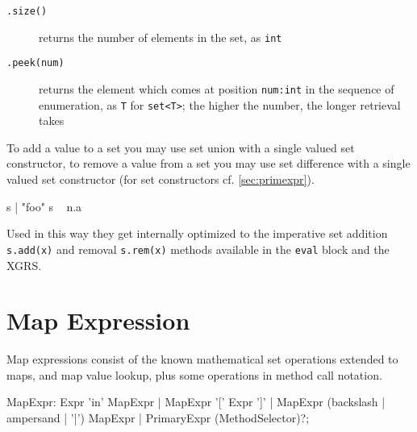 \begin{description}
\item[\texttt{.size()}] returns the number of elements in the set, as \texttt{int}
\item[\texttt{.peek(num)}] returns the element which comes at position \texttt{num:int} in the sequence of enumeration, as \texttt{T} for \verb#set<T>#; the higher the number, the longer retrieval takes
\end{description}

\begin{note}
To add a value to a set you may use set union with a single valued set constructor,
to remove a value from a set you may use set difference with a single valued set constructor (for set constructors cf. \ref{sec:primexpr}).
\begin{grgen}
s | { "foo" }
s \ { n.a }
\end{grgen}
Used in this way they get internally optimized to the imperative set addition \texttt{s.add(x)} and removal \texttt{s.rem(x)} methods available in the \texttt{eval} block and the XGRS.
\end{note}


\section{Map Expression} \label{sec:mapexpr}

Map expressions consist of the known mathematical set operations extended to maps, and map value lookup, plus some operations in method call notation.

\begin{rail}
  MapExpr: Expr 'in' MapExpr | MapExpr '[' Expr ']' | MapExpr (backslash | ampersand | '|') MapExpr | PrimaryExpr (MethodSelector)?;
\end{rail}

